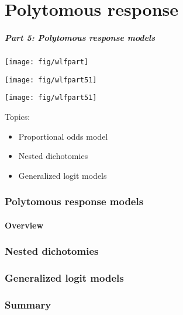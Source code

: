 \renewcommand{\FileName}{part5}

\part{Polytomous response}
\begin{frame}
  \frametitle{Part 5: Polytomous response models}
 \begin{minipage}[c]{.33\textwidth}
  \texttt{[image: fig/wlfpart]}
  \end{minipage}%
 \hfill
 \begin{minipage}[c]{.33\textwidth}
  \texttt{[image: fig/wlfpart51]}
 \end{minipage}
 \hfill
 \begin{minipage}[c]{.33\textwidth}
  \texttt{[image: fig/wlfpart51]}
 \end{minipage}

Topics:
  \begin{itemize}
    \item Proportional odds model
	\item Nested dichotomies
	\item Generalized logit models
  \end{itemize}
\end{frame}

\section{Polytomous response models}
\subsection{Overview}

\section{Nested dichotomies}


\section{Generalized logit models}



\section{Summary}


\endinput
